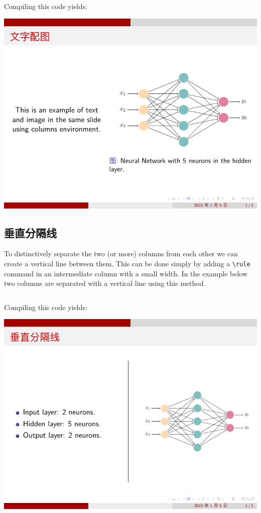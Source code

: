 Compiling this code yields:

\includegraphics{examples/beamer/column-figure-next-to-text.pdf}

\subsection{垂直分隔线}

To distinctively separate the two (or more) columns from each other we can create a vertical line between them. This can be done simply by adding a \verb|\rule| command in an intermediate column with a small width. In the example below two columns are separated with a vertical line using this method.

\inputminted[linenos=true]{latex}{examples/beamer/column-vertical-line.tex}

Compiling this code yields:

\includegraphics{examples/beamer/column-vertical-line.pdf}

